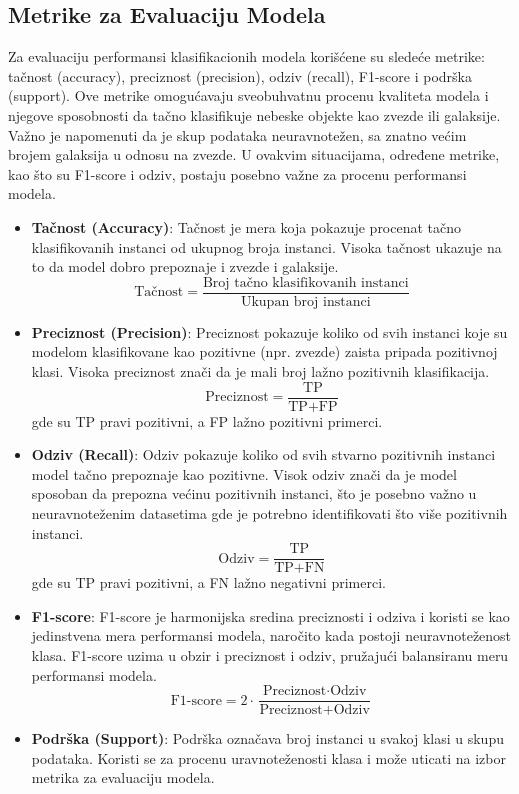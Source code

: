 \documentclass[a4paper,12pt]{article}
\begin{document}
\subsection{Metrike za Evaluaciju Modela}
Za evaluaciju performansi klasifikacionih modela korišćene su sledeće metrike: tačnost (accuracy), preciznost (precision), odziv (recall), F1-score i podrška (support). Ove metrike omogućavaju sveobuhvatnu procenu kvaliteta modela i njegove sposobnosti da tačno klasifikuje nebeske objekte kao zvezde ili galaksije.\\
Važno je napomenuti da je skup podataka neuravnotežen, sa znatno većim brojem galaksija u odnosu na zvezde. U ovakvim situacijama, određene metrike, kao što su F1-score i odziv, postaju posebno važne za procenu performansi modela.

\begin{itemize}
    \item \textbf{Tačnost (Accuracy)}: Tačnost je mera koja pokazuje procenat tačno klasifikovanih instanci od ukupnog broja instanci. Visoka tačnost ukazuje na to da model dobro prepoznaje i zvezde i galaksije.
    \[
    \text{Tačnost} = \frac{\text{Broj tačno klasifikovanih instanci}}{\text{Ukupan broj instanci}}
    \]
    
    \item \textbf{Preciznost (Precision)}: Preciznost pokazuje koliko od svih instanci koje su modelom klasifikovane kao pozitivne (npr. zvezde) zaista pripada pozitivnoj klasi. Visoka preciznost znači da je mali broj lažno pozitivnih klasifikacija.
    \[
    \text{Preciznost} = \frac{\text{TP}}{\text{TP} + \text{FP}}
    \]
    gde su TP pravi pozitivni, a FP lažno pozitivni primerci.

    \item \textbf{Odziv (Recall)}: Odziv pokazuje koliko od svih stvarno pozitivnih instanci model tačno prepoznaje kao pozitivne. Visok odziv znači da je model sposoban da prepozna većinu pozitivnih instanci, što je posebno važno u neuravnoteženim datasetima gde je potrebno identifikovati što više pozitivnih instanci.
    \[
    \text{Odziv} = \frac{\text{TP}}{\text{TP} + \text{FN}}
    \]
    gde su TP pravi pozitivni, a FN lažno negativni primerci.

    \item \textbf{F1-score}: F1-score je harmonijska sredina preciznosti i odziva i koristi se kao jedinstvena mera performansi modela, naročito kada postoji neuravnoteženost klasa. F1-score uzima u obzir i preciznost i odziv, pružajući balansiranu meru performansi modela.
    \[
    \text{F1-score} = 2 \cdot \frac{\text{Preciznost} \cdot \text{Odziv}}{\text{Preciznost} + \text{Odziv}}
    \]

    \item \textbf{Podrška (Support)}: Podrška označava broj instanci u svakoj klasi u skupu podataka. Koristi se za procenu uravnoteženosti klasa i može uticati na izbor metrika za evaluaciju modela.
\end{itemize}
\end{document}
